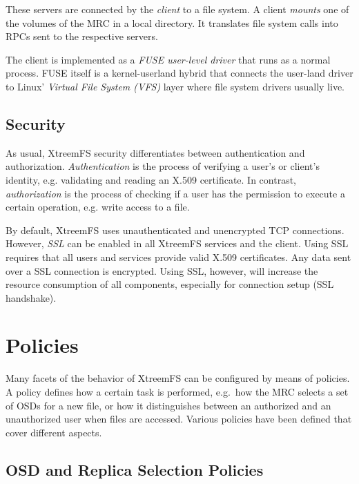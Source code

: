 \documentclass[a4paper,10pt]{book}
\begin{document}
These servers are connected by the \emph{client} to a file system. A client \emph{mounts} one of the volumes of the MRC in a local directory. It translates file system calls into RPCs sent to the respective servers.

The client is implemented as a \emph{FUSE user-level driver} that runs as a normal process. FUSE itself is a kernel-userland hybrid that connects the user-land driver to Linux' \emph{Virtual File System (VFS)} layer where file system drivers usually live.


\subsection{Security}

As usual, XtreemFS security differentiates between authentication and authorization. \emph{Authentication}  is the process of verifying a user's or client's identity, e.g. validating and reading an X.509 certificate. In contrast, \emph{authorization} is the process of checking if a user has the permission to execute a certain operation, e.g. write access to a file.

By default, XtreemFS uses unauthenticated and unencrypted TCP connections. However, \emph{SSL} can be enabled in all XtreemFS services and the client. Using SSL requires that all users and services provide valid X.509 certificates. Any data sent over a SSL connection is encrypted. Using SSL, however, will increase the resource consumption of all components, especially for connection setup (SSL handshake).


\section{Policies}

Many facets of the behavior of XtreemFS can be configured by means of policies. A policy defines how a certain task is performed, e.g.\ how the MRC selects a set of OSDs for a new file, or how it distinguishes between an authorized and an unauthorized user when files are accessed. Various policies have been defined that cover different aspects.

\subsection{OSD and Replica Selection Policies} \label{sec:osd_policies}
\end{document}
